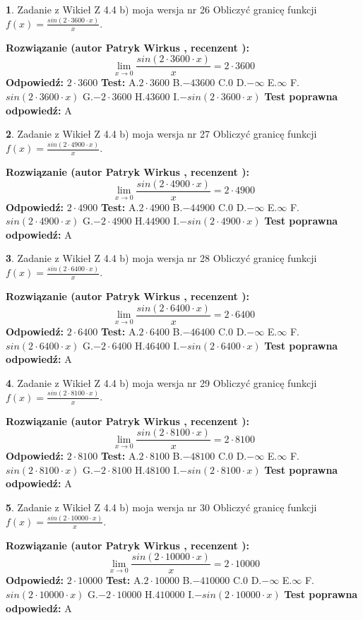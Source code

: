 \documentclass[12pt, a4paper]{article}
\theoremstyle{definition} %
\newtheorem{zad}{}
\newcommand{\zadStart}[1]{\begin{zad}#1\newline}
\newcommand{\zadStop}{\end{zad}}
\newcommand{\rozwStart}[2]{\noindent \textbf{Rozwiązanie (autor #1 , recenzent #2): }\newline}
\newcommand{\rozwStop}{\newline}
\newcommand{\odpStart}{\noindent \textbf{Odpowiedź:}\newline}
\newcommand{\odpStop}{\newline}
\newcommand{\testStart}{\noindent \textbf{Test:}\newline}
\newcommand{\testStop}{\newline}
\newcommand{\kluczStart}{\noindent \textbf{Test poprawna odpowiedź:}\newline}
\newcommand{\kluczStop}{\newline}
\begin{document}
\zadStart{Zadanie z Wikieł Z 4.4 b) moja wersja nr 26}
Obliczyć granicę funkcji $f(x)=\frac{sin(2 \cdot3600\cdot x)}{x}$.
\zadStop
\rozwStart{Patryk Wirkus}{}
$$\lim\limits_{x\to 0}\frac{sin(2 \cdot 3600\cdot x)}{x}=
2 \cdot 3600$$
\rozwStop
\odpStart
$2 \cdot 3600$
\odpStop
\testStart
A.$2 \cdot 3600$
B.$-43600$
C.$0$
D.$-\infty$
E.$\infty$
F.$sin(2 \cdot 3600\cdot x)$
G.$-2 \cdot 3600$
H.$43600$
I.$-sin(2 \cdot 3600\cdot x)$
\testStop
\kluczStart
A
\kluczStop



\zadStart{Zadanie z Wikieł Z 4.4 b) moja wersja nr 27}
Obliczyć granicę funkcji $f(x)=\frac{sin(2 \cdot4900\cdot x)}{x}$.
\zadStop
\rozwStart{Patryk Wirkus}{}
$$\lim\limits_{x\to 0}\frac{sin(2 \cdot 4900\cdot x)}{x}=
2 \cdot 4900$$
\rozwStop
\odpStart
$2 \cdot 4900$
\odpStop
\testStart
A.$2 \cdot 4900$
B.$-44900$
C.$0$
D.$-\infty$
E.$\infty$
F.$sin(2 \cdot 4900\cdot x)$
G.$-2 \cdot 4900$
H.$44900$
I.$-sin(2 \cdot 4900\cdot x)$
\testStop
\kluczStart
A
\kluczStop



\zadStart{Zadanie z Wikieł Z 4.4 b) moja wersja nr 28}
Obliczyć granicę funkcji $f(x)=\frac{sin(2 \cdot6400\cdot x)}{x}$.
\zadStop
\rozwStart{Patryk Wirkus}{}
$$\lim\limits_{x\to 0}\frac{sin(2 \cdot 6400\cdot x)}{x}=
2 \cdot 6400$$
\rozwStop
\odpStart
$2 \cdot 6400$
\odpStop
\testStart
A.$2 \cdot 6400$
B.$-46400$
C.$0$
D.$-\infty$
E.$\infty$
F.$sin(2 \cdot 6400\cdot x)$
G.$-2 \cdot 6400$
H.$46400$
I.$-sin(2 \cdot 6400\cdot x)$
\testStop
\kluczStart
A
\kluczStop



\zadStart{Zadanie z Wikieł Z 4.4 b) moja wersja nr 29}
Obliczyć granicę funkcji $f(x)=\frac{sin(2 \cdot8100\cdot x)}{x}$.
\zadStop
\rozwStart{Patryk Wirkus}{}
$$\lim\limits_{x\to 0}\frac{sin(2 \cdot 8100\cdot x)}{x}=
2 \cdot 8100$$
\rozwStop
\odpStart
$2 \cdot 8100$
\odpStop
\testStart
A.$2 \cdot 8100$
B.$-48100$
C.$0$
D.$-\infty$
E.$\infty$
F.$sin(2 \cdot 8100\cdot x)$
G.$-2 \cdot 8100$
H.$48100$
I.$-sin(2 \cdot 8100\cdot x)$
\testStop
\kluczStart
A
\kluczStop



\zadStart{Zadanie z Wikieł Z 4.4 b) moja wersja nr 30}
Obliczyć granicę funkcji $f(x)=\frac{sin(2 \cdot10000\cdot x)}{x}$.
\zadStop
\rozwStart{Patryk Wirkus}{}
$$\lim\limits_{x\to 0}\frac{sin(2 \cdot 10000\cdot x)}{x}=
2 \cdot 10000$$
\rozwStop
\odpStart
$2 \cdot 10000$
\odpStop
\testStart
A.$2 \cdot 10000$
B.$-410000$
C.$0$
D.$-\infty$
E.$\infty$
F.$sin(2 \cdot 10000\cdot x)$
G.$-2 \cdot 10000$
H.$410000$
I.$-sin(2 \cdot 10000\cdot x)$
\testStop
\kluczStart
A
\kluczStop
\end{document}

